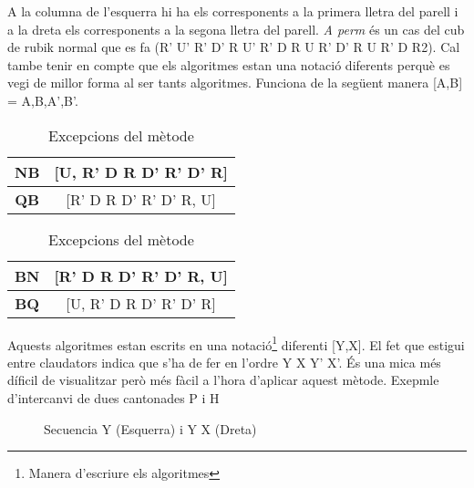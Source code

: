 A la columna de l'esquerra hi ha els corresponents a la primera lletra del parell i a la dreta els corresponents a la segona lletra del parell. \textit{A perm} és un cas del cub de rubik normal que es fa (R' U' R' D' R U' R' D R U R' D' R U R' D R2).
Cal tambe tenir en compte que els algoritmes estan una notació diferents perquè es vegi de millor forma al ser tants algoritmes. Funciona de la següent manera [A,B] = A,B,A',B'.

\begin{table}[h]
    \begin{minipage}{.5\linewidth}
        \centering
        \begin{tabular}{|c|c|}
            \hline
            \textbf{NB} & [U, R' D R D' R' D' R] \\
            \hline
            \textbf{QB} & [R' D R D' R' D' R, U] \\
            \hline
        \end{tabular}
    \end{minipage}
    \begin{minipage}{.5\linewidth}
        \centering
        \begin{tabular}{|c|c|}
            \hline
            \textbf{BN} & [R' D R D' R' D' R, U] \\
            \hline
            \textbf{BQ} & [U, R' D R D' R' D' R] \\
            \hline 
        \end{tabular}
    \end{minipage} 
    \caption{Excepcions del mètode}
\end{table}



Aquests algoritmes estan escrits en una notació\footnote{Manera d'escriure els algoritmes} diferenti [Y,X]. El fet que estigui entre claudators indica que s'ha de fer en l'ordre Y X Y' X'. És una mica més díficil de visualitzar però més fàcil a l'hora d'aplicar aquest mètode.
Exepmle d'intercanvi de dues cantonades P i H

\begin{figure}[h!]
    \centering
    \begin{subfigure}
        \centering\RubikCubeSolvedWY
    \end{subfigure}
    \begin{subfigure}
        \centering\RubikCubeSolvedWY
    \end{subfigure}
    \caption{Secuencia Y (Esquerra) i Y X (Dreta)}
\end{figure}

